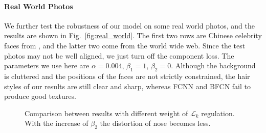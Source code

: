 \documentclass[10pt,twocolumn,letterpaper]{article}
\begin{document}
\paragraph{Real World Photos} We further test the robustness of our model on some real world photos, and the results are shown in Fig.~\ref{fig:real_world}. The first two rows are Chinese celebrity faces from \cite{zhang2010lighting}, and the latter two come from the world wide web. Since the test photos may not be well aligned, we just turn off the component loss. The parameters we use here are $\alpha=0.004$, $\beta_1=1$, $\beta_2=0$. Although the background is cluttered and the positions of the faces are not strictly constrained, the hair styles of our results are still clear and sharp, whereas FCNN and BFCN fail to produce good textures. 

\begin{figure}[htbp]
\centering
{}
\caption{Comparison between results with different weight of $\mathcal{L}_{k} $ regulation. With the increase of $\beta_2$ the distortion of nose becomes less.}
\label{fig:region_effect}
\end{figure}
\end{document}
